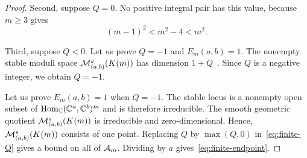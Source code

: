 \begin{proof}
Second, suppose $Q=0$. No positive integral pair has this value, because $m\ge3$ gives
\[
 (m-1)^2<m^2-4<m^2.
\]

Third, suppose $Q<0$. Let us prove $Q=-1$ and $E_m(a,b)=1$.
The nonempty stable moduli space $\mathcal M^s_{(a,b)}(K(m))$ has dimension
$1+Q$~\cite[part (2) of Proposition 4.3]{Weist}. Since $Q$ is a negative integer, we obtain $Q=-1$.

Let us prove $E_m(a,b)=1$ when $Q=-1$.
The stable locus is a nonempty open subset of $\operatorname{Hom}_{\mathbb C}(\mathbb C^a,\mathbb C^b)^m$ and is therefore irreducible.
The smooth geometric quotient $\mathcal M^s_{(a,b)}(K(m))$ is irreducible and zero-dimensional. Hence, $\mathcal M^s_{(a,b)}(K(m))$ consists of one point.
Replacing $Q$ by $\max(Q,0)$ in~\eqref{eq:finite-Q} gives a bound on all of $\mathcal A_m$.
Dividing by $a$ gives~\eqref{eq:finite-endpoint}.
\end{proof}


